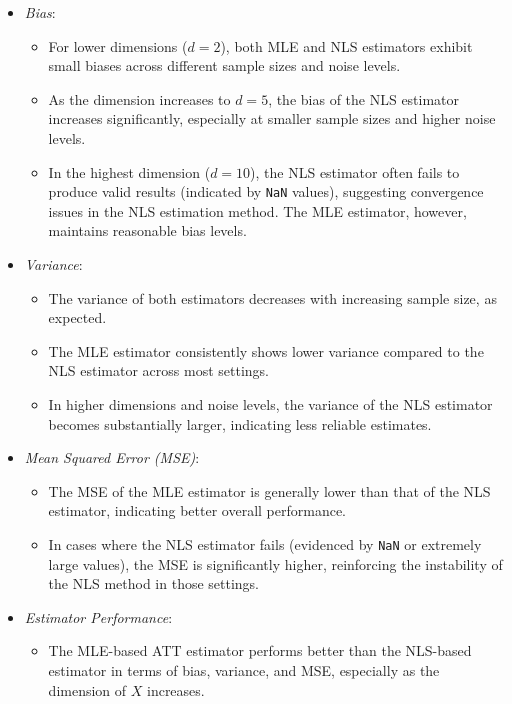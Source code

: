 \documentclass{article}
\begin{document}
\begin{itemize}
    \item \textit{Bias}:
    \begin{itemize}
        \item For lower dimensions (\( d = 2 \)), both MLE and NLS estimators exhibit small biases across different sample sizes and noise levels.
        \item As the dimension increases to \( d = 5 \), the bias of the NLS estimator increases significantly, especially at smaller sample sizes and higher noise levels.
        \item In the highest dimension (\( d = 10 \)), the NLS estimator often fails to produce valid results (indicated by \texttt{NaN} values), suggesting convergence issues in the NLS estimation method. The MLE estimator, however, maintains reasonable bias levels.
    \end{itemize}
    \item \textit{Variance}:
    \begin{itemize}
        \item The variance of both estimators decreases with increasing sample size, as expected.
        \item The MLE estimator consistently shows lower variance compared to the NLS estimator across most settings.
        \item In higher dimensions and noise levels, the variance of the NLS estimator becomes substantially larger, indicating less reliable estimates.
    \end{itemize}
    \item \textit{Mean Squared Error (MSE)}:
    \begin{itemize}
        \item The MSE of the MLE estimator is generally lower than that of the NLS estimator, indicating better overall performance.
        \item In cases where the NLS estimator fails (evidenced by \texttt{NaN} or extremely large values), the MSE is significantly higher, reinforcing the instability of the NLS method in those settings.
    \end{itemize}
    \item \textit{Estimator Performance}:
    \begin{itemize}
        \item The MLE-based ATT estimator performs better than the NLS-based estimator in terms of bias, variance, and MSE, especially as the dimension of \( X \) increases.

\end{itemize}
\end{itemize}
\end{document}
